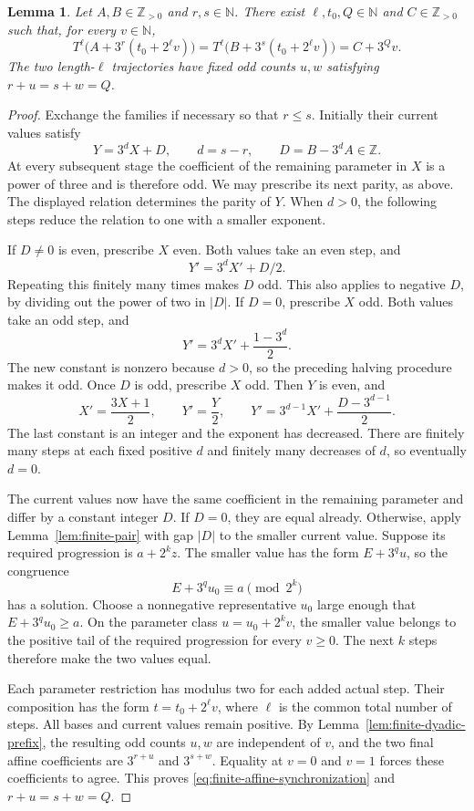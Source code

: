 \documentclass[11pt,a4paper]{article}
\newtheorem{lemma}[theorem]{Lemma}
\begin{document}
\begin{lemma}\label{lem:finite-affine-synchronization}
Let $A,B\in\mathbb Z_{>0}$ and $r,s\in\mathbb N$.
There exist $\ell,t_0,Q\in\mathbb N$ and
$C\in\mathbb Z_{>0}$ such that,
for every $v\in\mathbb N$,
\begin{equation}\label{eq:finite-affine-synchronization}
T^\ell\bigl(A+3^r(t_0+2^\ell v)\bigr)
=T^\ell\bigl(B+3^s(t_0+2^\ell v)\bigr)
=C+3^Qv.
\end{equation}
The two length-$\ell$ trajectories have fixed odd counts $u,w$
satisfying $r+u=s+w=Q$.
\end{lemma}
\begin{proof}
Exchange the families if necessary so that $r\le s$.
Initially their current values satisfy
\[
Y=3^dX+D,\qquad d=s-r,\qquad D=B-3^dA\in\mathbb Z.
\]
At every subsequent stage the coefficient of the remaining parameter
in $X$ is a power of three and is therefore odd. We may prescribe its next
parity, as above. The displayed relation determines the parity of $Y$.
When $d>0$, the following steps reduce the relation to one with a
smaller exponent.

If $D\ne0$ is even, prescribe $X$ even. Both values take an even
step, and
\[
Y'=3^dX'+D/2.
\]
Repeating this finitely many times makes $D$ odd. This also applies
to negative $D$, by dividing out the power of two in $|D|$.
If $D=0$, prescribe $X$ odd. Both values take an odd step, and
\[
Y'=3^dX'+\frac{1-3^d}{2}.
\]
The new constant is nonzero because $d>0$, so the preceding
halving procedure makes it odd.
Once $D$ is odd, prescribe $X$ odd. Then $Y$ is even, and
\begin{equation}\label{eq:finite-ratio-reduction}
X'=\frac{3X+1}{2},\qquad Y'=\frac Y2,
\qquad
Y'=3^{d-1}X'+\frac{D-3^{d-1}}2.
\end{equation}
The last constant is an integer and the exponent has decreased.
There are finitely many steps at each fixed positive $d$ and finitely
many decreases of $d$, so eventually $d=0$.

The current values now have the same coefficient in the remaining
parameter and differ by a constant integer $D$. If $D=0$, they
are equal already. Otherwise, apply Lemma~\ref{lem:finite-pair}
with gap $|D|$ to the smaller current value. Suppose its required
progression is $a+2^kz$. The smaller value has the form
$E+3^qu$, so the congruence
\[
E+3^qu_0\equiv a\pmod{2^k}
\]
has a solution. Choose a nonnegative representative $u_0$ large
enough that $E+3^qu_0\ge a$. On the parameter class
$u=u_0+2^kv$, the smaller value belongs to the positive tail of
the required progression for every $v\ge0$.
The next $k$ steps therefore make the two values equal.

Each parameter restriction has modulus two for each added actual
step. Their composition has the form $t=t_0+2^\ell v$, where
$\ell$ is the common total number of steps. All bases and current
values remain positive. By Lemma~\ref{lem:finite-dyadic-prefix},
the resulting odd counts $u,w$ are independent of $v$, and the
two final affine coefficients are $3^{r+u}$ and $3^{s+w}$.
Equality at $v=0$ and $v=1$ forces these coefficients to agree.
This proves \eqref{eq:finite-affine-synchronization} and
$r+u=s+w=Q$.
\end{proof}
\end{document}

